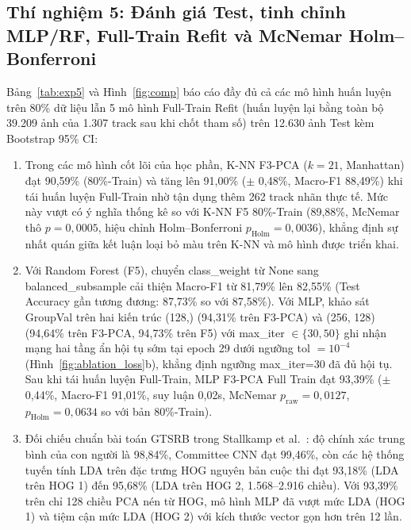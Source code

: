 \documentclass[conference]{IEEEtran}
\begin{document}
\subsection{Thí nghiệm 5: Đánh giá Test, tinh chỉnh MLP/RF, Full-Train Refit và McNemar Holm--Bonferroni}
Bảng~\ref{tab:exp5} và Hình~\ref{fig:comp} báo cáo đầy đủ cả các mô hình huấn luyện trên 80\% dữ liệu lẫn 5 mô hình Full-Train Refit (huấn luyện lại bằng toàn bộ 39.209 ảnh của 1.307 track sau khi chốt tham số) trên 12.630 ảnh Test kèm Bootstrap 95\% CI:
\begin{enumerate}
  \item Trong các mô hình cốt lõi của học phần, K-NN F3-PCA ($k=21$, Manhattan) đạt 90,59\% (80\%-Train) và tăng lên 91,00\% ($\pm$ 0,48\%, Macro-F1 88,49\%) khi tái huấn luyện Full-Train nhờ tận dụng thêm 262 track nhãn thực tế. Mức này vượt có ý nghĩa thống kê so với K-NN F5 80\%-Train (89,88\%, McNemar thô $p = 0,0005$, hiệu chỉnh Holm--Bonferroni $p_{\text{Holm}} = 0,0036$), khẳng định sự nhất quán giữa kết luận loại bỏ màu trên K-NN và mô hình được triển khai.
  \item Với Random Forest (F5), chuyển class\_weight từ None sang balanced\_subsample cải thiện Macro-F1 từ 81,79\% lên 82,55\% (Test Accuracy gần tương đương: 87,73\% so với 87,58\%). Với MLP, khảo sát GroupVal trên hai kiến trúc (128,) (94,31\% trên F3-PCA) và (256, 128) (94,64\% trên F3-PCA, 94,73\% trên F5) với max\_iter $\in \{30, 50\}$ ghi nhận mạng hai tầng ẩn hội tụ sớm tại epoch 29 dưới ngưỡng tol $= 10^{-4}$ (Hình~\ref{fig:ablation_loss}b), khẳng định ngưỡng max\_iter=30 đã đủ hội tụ. Sau khi tái huấn luyện Full-Train, MLP F3-PCA Full Train đạt 93,39\% ($\pm$ 0,44\%, Macro-F1 91,01\%, suy luận 0,02s, McNemar $p_{\text{raw}} = 0,0127$, $p_{\text{Holm}} = 0,0634$ so với bản 80\%-Train).
  \item Đối chiếu chuẩn bài toán GTSRB trong Stallkamp et al.~\cite{stallkamp2012man}: độ chính xác trung bình của con người là 98,84\%, Committee CNN đạt 99,46\%, còn các hệ thống tuyến tính LDA trên đặc trưng HOG nguyên bản cuộc thi đạt 93,18\% (LDA trên HOG 1) đến 95,68\% (LDA trên HOG 2, 1.568--2.916 chiều). Với 93,39\% trên chỉ 128 chiều PCA nén từ HOG, mô hình MLP đã vượt mức LDA (HOG 1) và tiệm cận mức LDA (HOG 2) với kích thước vector gọn hơn trên 12 lần.
\end{enumerate}
\end{document}

